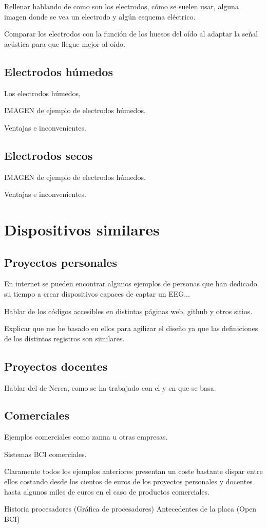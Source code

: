 Rellenar hablando de como son los electrodos, cómo se suelen usar, alguna imagen donde se vea un electrodo y algún esquema eléctrico.

Comparar los electrodos con la función de los huesos del oído al adaptar la señal acústica para que llegue mejor al oído.

\subsection{Electrodos húmedos\label{sec:Elec_humedos}}

Los electrodos húmedos, 

IMAGEN de ejemplo de electrodos húmedos.

Ventajas e inconvenientes.

\subsection{Electrodos secos\label{sec:Elec_secos}}

IMAGEN de ejemplo de electrodos húmedos.

Ventajas e inconvenientes.

\section{Dispositivos similares\label{sec:Disp_similares}}



\subsection{Proyectos personales\label{sec:Pro_personales}}

En internet se pueden encontrar algunos ejemplos de personas que han dedicado su tiempo a crear dispositivos capaces de captar un EEG...

Hablar de los códigos accesibles en distintas páginas web, github y otros sitios.

Explicar que me he basado en ellos para agilizar el diseño ya que las definiciones de los distintos registros son similares.

\subsection{Proyectos docentes\label{sec:Pro_docentes}}

Hablar del de Nerea, como se ha trabajado con el y en que se basa.

\subsection{Comerciales\label{sec:Pro_empresa}}

Ejemplos comerciales como zanna u otras empresas.

Sistemas BCI comerciales.

Claramente todos los ejemplos anteriores presentan un coste bastante dispar entre ellos costando desde los cientos de euros de los proyectos personales y docentes hasta algunos miles de euros en el caso de productos comerciales.

Historia procesadores (Gráfica de procesadores)
Antecedentes de la placa (Open BCI)